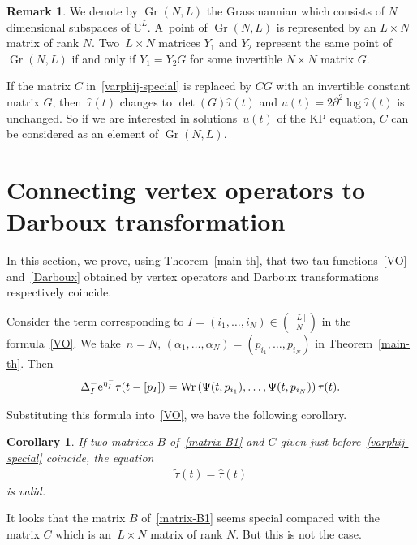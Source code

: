 \documentclass[pdftex]{sigma}
\numberwithin{equation}{section}
\newtheorem{Corollary}[Theorem]{Corollary}
\theoremstyle{definition}
\newtheorem{Remark}[Theorem]{Remark}
\begin{document}
\begin{Remark}\label{Grassmannian}
We denote by $\operatorname{Gr}(N,L)$ the Grassmannian which consists of $N$ dimensional
subspaces of ${\mathbb C}^L$. A~point of $\operatorname{Gr}(N,L)$ is represented by an
$L\times N$ matrix of rank $N$. Two~${L\times N}$ matrices $Y_1$ and $Y_2$ represent
the same point of $\operatorname{Gr}(N,L)$ if and only if $Y_1=Y_2G$ for some invertible $N\times N$
matrix $G$.

If the matrix $C$ in~\eqref{varphij-special} is replaced by $CG$ with an invertible constant matrix $G$, then~$\widehat{\tau}(t)$ changes to $\det(G)\widehat{\tau}(t)$ and
$u(t)=2\partial^2\log \widehat{\tau}(t)$ is unchanged. So if we are interested in
solutions~$u(t)$ of the KP equation, $C$ can be considered as an element
of $\operatorname{Gr}(N,L)$.
\end{Remark}








\section{Connecting vertex operators to Darboux transformation}\label{sec5}
In this section, we prove, using Theorem~\ref{main-th}, that two tau functions~\eqref{VO} and~\eqref{Darboux} obtained by
vertex operators and Darboux transformations respectively coincide.

Consider the term corresponding to
$ I=(i_1,\dots ,i_N)\in \binom{[L]}{N}$ in the formula~\eqref{VO}.
We take~${n=N}$, $(\alpha_1,\dots ,\alpha_N)=(p_{i_1},\dots ,p_{i_N})$ in Theorem~\ref{main-th}.
Then
\begin{gather*}
\Delta_I^{-}{\rm e}^{\eta_I^{-}}\tau(t-[p_I])=
 \operatorname{Wr}\left(\Psi(t,p_{i_1}),\dots ,\Psi(t,p_{i_N})\right)\tau(t).
 \end{gather*}

Substituting this formula into~\eqref{VO}, we have the following corollary.

\begin{Corollary}\label{VO-D-identity}
If two matrices $B$ of~\eqref{matrix-B1} and $C$ given just before~\eqref{varphij-special} coincide, the equation
\begin{gather}
\tilde{\tau}(t)=\widehat{\tau}(t)
\label{VO=Darboux}
\end{gather}
is valid.
\end{Corollary}

It looks that the matrix $B$ of~\eqref{matrix-B1} seems special compared with the matrix $C$ which is an~${L\times N}$ matrix of rank $N$.
But this is not the case.
\end{document}
